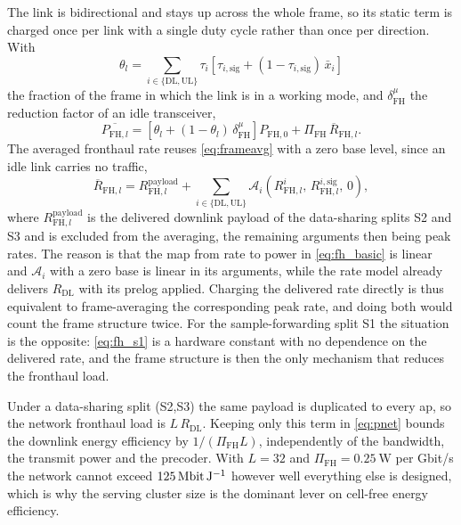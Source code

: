 The link is bidirectional and stays up across the whole frame, so its static term
is charged once per link with a single duty cycle rather than once per direction.
With
\begin{equation}
\label{eq:fh_duty}
\theta_{l} = \sum_{i\in\{\mathrm{DL},\mathrm{UL}\}}
\tau_{i}\left[\tau_{i,\mathrm{sig}} + (1-\tau_{i,\mathrm{sig}})\,\bar x_{i}\right]
\end{equation}
the fraction of the frame in which the link is in a working mode, and
$\delta^{\mu}_{\mathrm{FH}}$ the reduction factor of an idle transceiver,
\begin{equation}
\label{eq:fh_avg}
\overline{P_{\mathrm{FH},l}} =
\left[\theta_{l} + (1-\theta_{l})\,\delta^{\mu}_{\mathrm{FH}}\right]
P_{\mathrm{FH},0} + \Pi_{\mathrm{FH}}\,\overline{R}_{\mathrm{FH},l} .
\end{equation}
The averaged fronthaul rate reuses \eqref{eq:frameavg} with a zero base level,
since an idle link carries no traffic,
\begin{equation}
\label{eq:fh_rate_avg}
\overline{R}_{\mathrm{FH},l} = R^{\mathrm{payload}}_{\mathrm{FH},l}
+ \sum_{i\in\{\mathrm{DL},\mathrm{UL}\}}
\mathcal{A}_{i}\!\left(R^{i}_{\mathrm{FH},l},\,
R^{i,\mathrm{sig}}_{\mathrm{FH},l},\,0\right),
\end{equation}
where $R^{\mathrm{payload}}_{\mathrm{FH},l}$ is the delivered downlink payload of
the data-sharing splits S2 and S3 and is excluded from the averaging, the
remaining arguments then being peak rates. The reason is that the map from rate
to power in \eqref{eq:fh_basic} is linear and $\mathcal{A}_{i}$ with a zero base
is linear in its arguments, while the rate model already delivers
$R_{\mathrm{DL}}$ with its prelog applied. Charging the delivered rate directly
is thus equivalent to frame-averaging the corresponding peak rate, and doing both
would count the frame structure twice. For the sample-forwarding split S1 the
situation is the opposite: \eqref{eq:fh_s1} is a hardware constant with no
dependence on the delivered rate, and the frame structure is then the only
mechanism that reduces the fronthaul load.

\begin{remark}
\label{rem:fh_ceiling}
Under a data-sharing split (S2,S3) the same payload is duplicated to every \gls{ap}, so
the network fronthaul load is $L\,R_{\mathrm{DL}}$. Keeping only this term in
\eqref{eq:pnet} bounds the downlink energy efficiency by
$1/(\Pi_{\mathrm{FH}}L)$, independently of the bandwidth, the transmit power and
the precoder. With $L=32$ and $\Pi_{\mathrm{FH}}=\SI{0.25}{\watt}$ per Gbit/s the
network cannot exceed $\SI{125}{\mega\bit\per\joule}$ however well everything
else is designed, which is why the serving cluster size is the dominant lever on
cell-free energy efficiency.
\end{remark}

